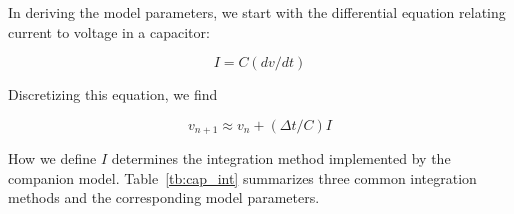 \documentclass{article}
\begin{document}
In deriving the model parameters, we start with the differential equation relating current to voltage in a capacitor:

\begin{equation}
I=C(dv/dt)
\end{equation}

Discretizing this equation, we find

\begin{equation}
v_{n+1} \approx v_n+(\Delta t/C)I
\end{equation}

How we define $I$ determines the integration method implemented by the companion model.  Table~\ref{tb:cap_int} summarizes three common integration methods and the corresponding model parameters.

\begin{table}[h]
\centering
\caption{Capacitor companion model parameters for integration methods \label{tb:cap_int}}
\end{table}
\end{document}
